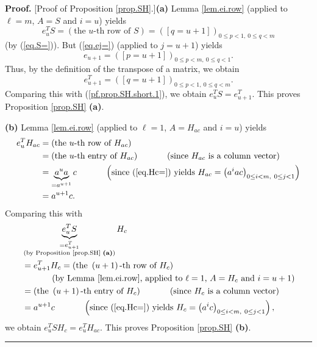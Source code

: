 \documentclass[numbers=enddot,12pt,final,onecolumn,notitlepage]{scrartcl}%
\theoremstyle{definition}
\newenvironment{proof}[1][Proof]{\noindent\textbf{#1.} }{\ \rule{0.5em}{0.5em}}
\newenvironment{vershort}{}{}
\begin{document}
\begin{vershort}
\begin{proof}
[Proof of Proposition \ref{prop.SH}.]\textbf{(a)} Lemma \ref{lem.ei.row}
(applied to $\ell=m$, $A=S$ and $i=u$) yields%
\begin{equation}
e_{u}^{T}S=\left(  \text{the }u\text{-th row of }S\right)  =\left(  \left[
q=u+1\right]  \right)  _{0\leq p<1,\ 0\leq q<m} \label{pf.prop.SH.short.1}%
\end{equation}
(by (\ref{eq.S=})). But (\ref{eq.ej=}) (applied to $j=u+1$) yields%
\[
e_{u+1}=\left(  \left[  p=u+1\right]  \right)  _{0\leq p<m,\ 0\leq q<1}.
\]
Thus, by the definition of the transpose of a matrix, we obtain%
\[
e_{u+1}^{T}=\left(  \left[  q=u+1\right]  \right)  _{0\leq p<1,\ 0\leq q<m}.
\]
Comparing this with (\ref{pf.prop.SH.short.1}), we obtain $e_{u}^{T}%
S=e_{u+1}^{T}$. This proves Proposition \ref{prop.SH} \textbf{(a)}.

\textbf{(b)} Lemma \ref{lem.ei.row} (applied to $\ell=1$, $A=H_{ac}$ and
$i=u$) yields%
\begin{align*}
e_{u}^{T}H_{ac}  &  =\left(  \text{the }u\text{-th row of }H_{ac}\right) \\
&  =\left(  \text{the }u\text{-th entry of }H_{ac}\right)
\ \ \ \ \ \ \ \ \ \ \left(  \text{since }H_{ac}\text{ is a column
vector}\right) \\
&  =\underbrace{a^{u}a}_{=a^{u+1}}c\ \ \ \ \ \ \ \ \ \ \left(  \text{since
(\ref{eq.Hc=}) yields }H_{ac}=\left(  a^{i}ac\right)  _{0\leq i<m,\ 0\leq
j<1}\right) \\
&  =a^{u+1}c.
\end{align*}
Comparing this with%
\begin{align*}
&  \underbrace{e_{u}^{T}S}_{\substack{=e_{u+1}^{T}\\\text{(by Proposition
\ref{prop.SH} \textbf{(a)})}}}H_{c}\\
&  =e_{u+1}^{T}H_{c}=\left(  \text{the }\left(  u+1\right)  \text{-th row of
}H_{c}\right) \\
&  \ \ \ \ \ \ \ \ \ \ \left(  \text{by Lemma \ref{lem.ei.row}, applied to
}\ell=1\text{, }A=H_{c}\text{ and }i=u+1\right) \\
&  =\left(  \text{the }\left(  u+1\right)  \text{-th entry of }H_{c}\right)
\ \ \ \ \ \ \ \ \ \ \left(  \text{since }H_{c}\text{ is a column
vector}\right) \\
&  =a^{u+1}c\ \ \ \ \ \ \ \ \ \ \left(  \text{since (\ref{eq.Hc=}) yields
}H_{c}=\left(  a^{i}c\right)  _{0\leq i<m,\ 0\leq j<1}\right)  ,
\end{align*}
we obtain $e_{u}^{T}SH_{c}=e_{u}^{T}H_{ac}$. This proves Proposition
\ref{prop.SH} \textbf{(b)}.
\end{proof}
\end{vershort}
\end{document}
